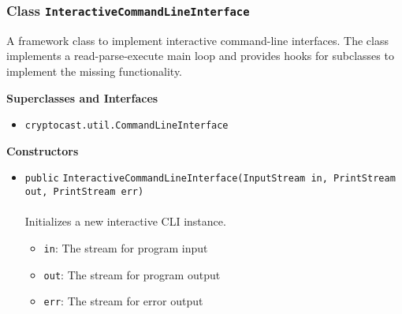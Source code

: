 \subsubsection{Class \lstinline|InteractiveCommandLineInterface|}
A framework class to implement interactive command-line interfaces. The class implements
 a read-parse-execute main loop and provides hooks for subclasses to implement the missing
 functionality. \\
\noindent\begin{minipage}[t]{5cm}
\vspace{0.3em}
\hspace*{2em}
\vspace{0.3em}
\end{minipage}



\textbf{\sffamily Superclasses and Interfaces}
\begin{itemize}
\item \lstinline|cryptocast.util.CommandLineInterface|
\end{itemize}


\textbf{\sffamily Constructors}
\begin{itemize}
\item \lstinline|public| \lstinline|InteractiveCommandLineInterface|\lstinline|(InputStream in, PrintStream out, PrintStream err)|\\ \\[-0.6em]
Initializes a new interactive CLI instance.
\begin{itemize}
\item \lstinline|in|: The stream for program input
\item \lstinline|out|: The stream for program output
\item \lstinline|err|: The stream for error output
\end{itemize}



\end{itemize}


